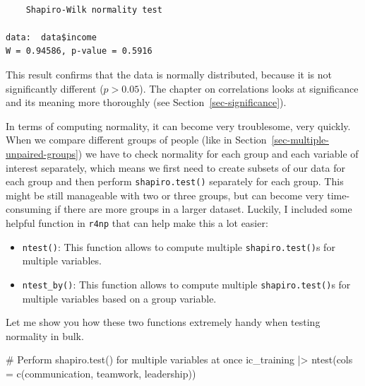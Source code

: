 \documentclass[
  letterpaper,
]{krantz}
\makeatletter
\newenvironment{Shaded}{\begin{snugshade}}{\end{snugshade}}
\newcommand{\AttributeTok}[1]{\textcolor[rgb]{0.40,0.45,0.13}{#1}}
\newcommand{\CommentTok}[1]{\textcolor[rgb]{0.37,0.37,0.37}{#1}}
\newcommand{\FunctionTok}[1]{\textcolor[rgb]{0.28,0.35,0.67}{#1}}
\newcommand{\NormalTok}[1]{\textcolor[rgb]{0.00,0.23,0.31}{#1}}
\newcommand{\SpecialCharTok}[1]{\textcolor[rgb]{0.37,0.37,0.37}{#1}}
\newenvironment{kframe}{%
\medskip{}
\setlength{\fboxsep}{.8em}
 \def\at@end@of@kframe{}%
 \ifinner\ifhmode%
  \def\at@end@of@kframe{\end{minipage}}%
  \begin{minipage}{\columnwidth}%
 \fi\fi%
 \def\FrameCommand##1{\hskip\@totalleftmargin \hskip-\fboxsep
 \colorbox{shadecolor}{##1}\hskip-\fboxsep
     \hskip-\linewidth \hskip-\@totalleftmargin \hskip\columnwidth}%
 \MakeFramed {\advance\hsize-\width
   \@totalleftmargin\z@ \linewidth\hsize
   \@setminipage}}%
 {\par\unskip\endMakeFramed%
 \at@end@of@kframe}
\renewenvironment{Shaded}{\begin{kframe}}{\end{kframe}}
\makeatother
\begin{document}
\begin{Shaded}
\end{Shaded}

\begin{verbatim}

    Shapiro-Wilk normality test

data:  data$income
W = 0.94586, p-value = 0.5916
\end{verbatim}

This result confirms that the data is normally distributed, because it
is not significantly different (\(p > 0.05\)). The chapter on
correlations looks at significance and its meaning more thoroughly (see
Section~\ref{sec-significance}).

In terms of computing normality, it can become very troublesome, very
quickly. When we compare different groups of people (like in
Section~\ref{sec-multiple-unpaired-groups}) we have to check normality
for each group and each variable of interest separately, which means we
first need to create subsets of our data for each group and then perform
\texttt{shapiro.test()} separately for each group. This might be still
manageable with two or three groups, but can become very time-consuming
if there are more groups in a larger dataset. Luckily, I included some
helpful function in \texttt{r4np} that can help make this a lot easier:

\begin{itemize}
\item
  \texttt{ntest()}: This function allows to compute multiple
  \texttt{shapiro.test()}s for multiple variables.
\item
  \texttt{ntest\_by()}: This function allows to compute multiple
  \texttt{shapiro.test()}s for multiple variables based on a group
  variable.
\end{itemize}

Let me show you how these two functions extremely handy when testing
normality in bulk.

\begin{Shaded}
\begin{Highlighting}[]
\CommentTok{\# Perform \textquotesingle{}shapiro.test()\textquotesingle{} for multiple variables at once}
\NormalTok{ic\_training }\SpecialCharTok{|\textgreater{}} \FunctionTok{ntest}\NormalTok{(}\AttributeTok{cols =} \FunctionTok{c}\NormalTok{(communication,}
\NormalTok{                              teamwork,}
\NormalTok{                              leadership))}
\end{Highlighting}
\end{Shaded}
\end{document}
